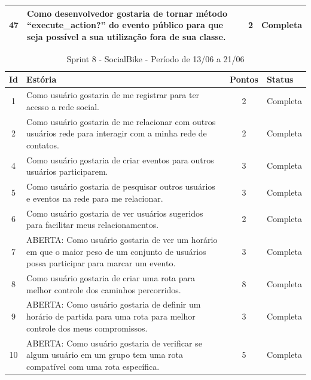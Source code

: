 \begin{apendicesenv}
\begin{table}[!h]
\begin{adjustbox}{width=\textwidth}
\begin{tabular}{@{}cp{10cm}cl@{}}
47 & Como desenvolvedor gostaria de tornar método ``execute\_action?'' do evento público para que seja possível a sua utilização fora de sua classe. & 2 & Completa \\ \bottomrule
\end{tabular}
\end{adjustbox}
\end{table}

\begin{table}[!h]
\centering
\caption{Sprint 8 - SocialBike - Período de 13/06 a 21/06}
\label{sprint_8}
\begin{adjustbox}{width=\textwidth}
\begin{tabular}{@{}cp{10cm}cl@{}}
\toprule
\textbf{Id}  & \textbf{Estória} & \textbf{Pontos} & \textbf{Status} \\ \midrule
1 & Como usuário gostaria de me registrar para ter acesso a rede social. & 2 & Completa \\

2 & Como usuário gostaria de me relacionar com outros usuários rede para interagir com a minha rede de contatos. & 2 & Completa \\

4 & Como usuário gostaria de criar eventos para outros usuários participarem. & 3 & Completa \\

5 & Como usuário gostaria de pesquisar outros usuários e eventos na rede para me relacionar. & 3 & Completa \\

6 & Como usuário gostaria de ver usuários sugeridos para facilitar meus relacionamentos. & 2 & Completa \\

7 & ABERTA: Como usuário gostaria de ver um horário em que o maior peso de um conjunto de usuários possa participar para marcar um evento. & 3 & Completa \\

8 & Como usuário gostaria de criar uma rota para melhor controle dos caminhos percorridos. & 8 & Completa \\

9 & ABERTA: Como usuário gostaria de definir um horário de partida para uma rota para melhor controle dos meus compromissos. & 3  & Completa \\

10 & ABERTA: Como usuário gostaria de verificar se algum usuário em um grupo tem uma rota compatível com uma rota específica. & 5 & Completa \\ \bottomrule
\end{tabular}
\end{adjustbox}
\end{table}

\end{apendicesenv}
